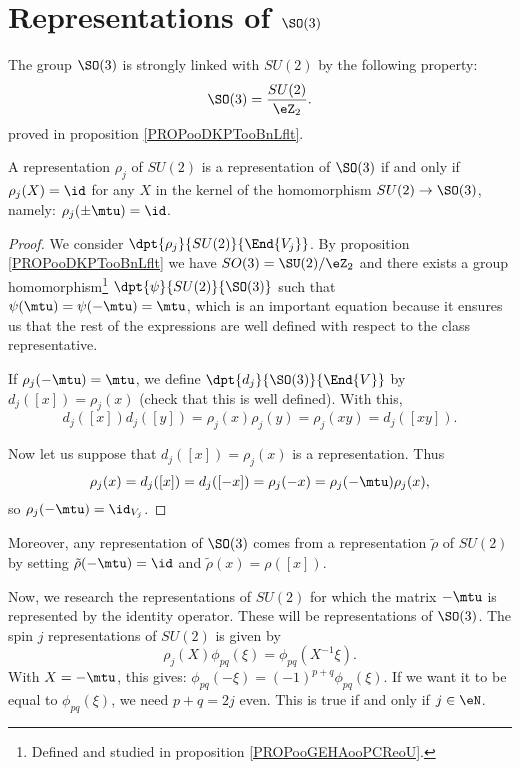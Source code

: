 \section{Representations of \texorpdfstring{$\SO(3)$}{SO3}}

The group $\SO(3)$ is strongly linked with $SU(2)$ by the following property:
\begin{equation}
	\SO(3)=\frac{SU(2)}{\eZ_2}.
\end{equation}
proved in proposition \ref{PROPooDKPTooBnLflt}.

\begin{lemma}\label{lem:SO_3}
	A representation $\rho_j$ of $SU(2)$ is a representation of $\SO(3)$ if and only if $\rho_j(X)=\id$ for any $X$ in the kernel of the homomorphism $SU(2)\to \SO(3)$, namely: $\rho_j(\pm\mtu)=\id$.
\end{lemma}

\begin{proof}
	We consider $\dpt{\rho_j}{SU(2)}{\End{V_j}}$. By proposition \ref{PROPooDKPTooBnLflt} we have \( SO(3)=\SU(2)/\eZ_2\) and there exists a group homomorphism\footnote{Defined and studied in proposition \ref{PROPooGEHAooPCReoU}.} $\dpt{\psi}{SU(2)}{\SO(3)}$ such that $\psi(\mtu)=\psi(-\mtu)=\mtu$, which is an important equation because it ensures us that the rest of the expressions are well defined with respect to the class representative.

	If $\rho_j(-\mtu)=\mtu$, we define $\dpt{d_j}{\SO(3)}{\End{V}}$ by $d_j([x])=\rho_j(x)$ (check that this is well defined). With this,
	\[
		d_j([x])d_j([y])=\rho_j(x)\rho_j(y)=\rho_j(xy)=d_j([xy]).
	\]

	Now let us suppose that $d_j([x])=\rho_j(x)$ is a representation. Thus
	\[
		\rho_j(x)=d_j([x])=d_j([-x])=\rho_j(-x)=\rho_j(-\mtu)\rho_j(x),
	\]
	so $\rho_j(-\mtu)=\id_{V_j}$.
\end{proof}

Moreover, any representation of $\SO(3)$ comes from a representation $\tilde\rho$ of $SU(2)$ by setting $\tilde\rho(-\mtu)=\id$ and $\tilde\rho(x)=\rho([x])$.

Now, we research the representations of $SU(2)$ for which the matrix $-\mtu$ is represented by the identity operator. These will be representations of $\SO(3)$. The spin $j$ representations of $SU(2)$ is given by
\begin{equation}
	\rho_j(X)\phi_{pq}(\xi)=\phi_{pq}(X^{-1}\xi).
\end{equation}
With $X=-\mtu$, this gives: $\phi_{pq}(-\xi)=(-1)^{p+q}\phi_{pq}(\xi)$. If we want it to be equal to $\phi_{pq}(\xi)$, we need $p+q=2j$ even. This is true if and only if $j\in\eN$.

